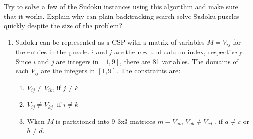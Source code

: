 \documentclass[12pt]{article}
\newenvironment{problem}[2][Problem]{\begin{trivlist}
\item[\hskip \labelsep {\bfseries #1}\hskip \labelsep {\bfseries #2.}]}{\end{trivlist}}
\begin{document}
\begin{problem}{2}
\begin{enumerate}
			Try to solve a few of the Sudoku instances using this algorithm and make sure that it works.
			Explain why can plain backtracking search solve Sudoku puzzles quickly despite the size of the problem?
	\end{enumerate}
	\begin{enumerate}
		\item Sudoku can be represented as a CSP with a matrix of variables $M=V_{ij}$ for the entries in the puzzle.
			$i$ and $j$ are the row and column index, respectively.
			Since $i$ and $j$ are integers in $[1,9]$, there are 81 variables.
			The domains of each $V_{ij}$ are the integers in $[1,9]$.
			The constraints are:
			\begin{enumerate}
				\item $V_{ij} \neq V_{ik}$, if $j \neq k$
				\item $V_{ij} \neq V_{kj}$, if $i \neq k$
				\item When $M$ is partitioned into 9 3x3 matrices $m = V_{ab}$, $V_{ab} \neq V_{cd}$ , if $a \neq c$ or $b \neq d$.
			\end{enumerate}
	\end{enumerate}
\end{problem}
\end{document}
